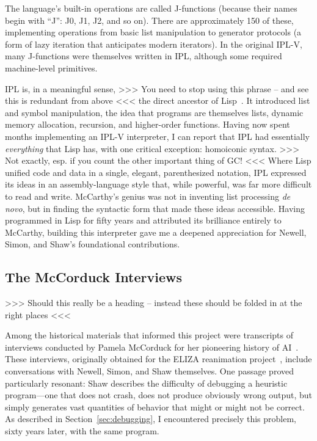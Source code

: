 \documentclass[journal]{IEEEtran}
\begin{document}
The language's built-in operations are called J-functions (because
their names begin with ``J'': J0, J1, J2, and so on). There are
approximately 150 of these, implementing operations from basic list
manipulation to generator protocols (a form of lazy iteration that
anticipates modern iterators). In the original IPL-V, many J-functions
were themselves written in IPL, although some required machine-level
primitives.

IPL is, in a meaningful sense, >>> You need to stop using this phrase
-- and see this is redundant from above <<< the direct ancestor of
Lisp~\cite{mccarthy1960lisp}. It introduced list and symbol
manipulation, the idea that programs are themselves lists, dynamic
memory allocation, recursion, and higher-order functions. Having now
spent months implementing an IPL-V interpreter, I can report that IPL
had essentially \textit{everything} that Lisp has, with one critical
exception: homoiconic syntax. >>> Not exactly, esp. if you count the
other important thing of GC! <<< Where Lisp unified code and data in a
single, elegant, parenthesized notation, IPL expressed its ideas in an
assembly-language style that, while powerful, was far more difficult
to read and write. McCarthy's genius was not in inventing list
processing \textit{de novo}, but in finding the syntactic form that
made these ideas accessible. Having programmed in Lisp for fifty years
and attributed its brilliance entirely to McCarthy, building this
interpreter gave me a deepened appreciation for Newell, Simon, and
Shaw's foundational contributions.

\subsection{The McCorduck Interviews} >>> Should this really be a heading -- instead these should be folded in at the right places <<<

Among the historical materials that informed this project were
transcripts of interviews conducted by Pamela McCorduck for her
pioneering history of AI~\cite{mccorduck1979machines}. These
interviews, originally obtained for the ELIZA reanimation
project~\cite{lane2025eliza}, include conversations with Newell,
Simon, and Shaw themselves. One passage proved particularly resonant:
Shaw describes the difficulty of debugging a heuristic program---one
that does not crash, does not produce obviously wrong output, but
simply generates vast quantities of behavior that might or might not
be correct. As described in Section~\ref{sec:debugging}, I encountered
precisely this problem, sixty years later, with the same program.
\end{document}
